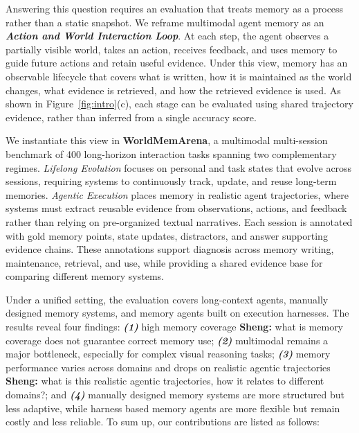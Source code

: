 \documentclass{article}
\newcommand{\sheng}[1]{{\color{blue} {\bf Sheng:} #1}}
\begin{document}
Answering this question requires an evaluation that treats memory as a process rather than a static snapshot. We reframe multimodal agent memory as an \textit{\textbf{Action and World Interaction Loop}}. At each step, the agent observes a partially visible world, takes an action, receives feedback, and uses memory to guide future actions and retain useful evidence. Under this view, memory has an observable lifecycle that covers what is written, how it is maintained as the world changes, what evidence is retrieved, and how the retrieved evidence is used. As shown in Figure~\ref{fig:intro}(c), each stage can be evaluated using shared trajectory evidence, rather than inferred from a single accuracy score.


We instantiate this view in \textbf{WorldMemArena}, a multimodal multi-session benchmark of 400 long-horizon interaction tasks spanning two complementary regimes. \textit{Lifelong Evolution} focuses on personal and task states that evolve across sessions, requiring systems to continuously track, update, and reuse long-term memories. \textit{Agentic Execution} places memory in realistic agent trajectories, where systems must extract reusable evidence from observations, actions, and feedback rather than relying on pre-organized textual narratives. Each session is annotated with gold memory points, state updates, distractors, and answer supporting evidence chains. These annotations support diagnosis across memory writing, maintenance, retrieval, and use, while providing a shared evidence base for comparing different memory systems.

Under a unified setting, the evaluation covers long-context agents, manually designed memory systems, and memory agents built on execution harnesses. The results reveal four findings: 
\textit{\textbf{(1)}} high memory coverage \sheng{what is memory coverage} does not guarantee correct memory use;
\textit{\textbf{(2)}} multimodal  remains a major bottleneck, especially for complex visual reasoning tasks;
\textit{\textbf{(3)}} memory performance varies across domains and drops on realistic agentic trajectories\sheng{what is this realistic agentic trajectories, how it relates to different domains?}; and
\textit{\textbf{(4)}} manually designed memory systems are more structured but less adaptive, while harness based memory agents are more flexible but remain costly and less reliable. To sum up, our contributions are listed as follows:
\end{document}
